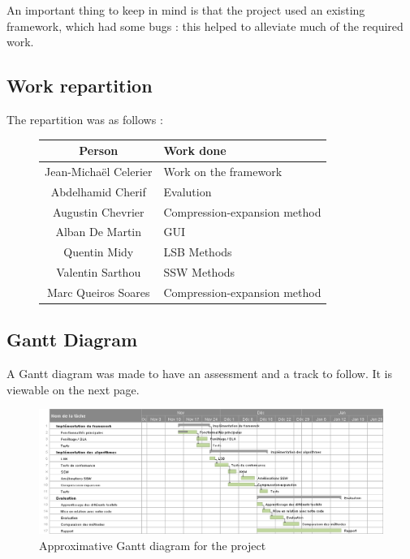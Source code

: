 An important thing to keep in mind is that the project used an existing framework, which had some bugs : this helped to alleviate much of the required work.

\subsection{Work repartition}
The repartition was as follows : 
\begin{figure}[h!]
\centering
\begin{tabular}{|c|l|}
\hline
Person & Work done \\
\hline
Jean-Michaël Celerier & Work on the framework \\
Abdelhamid Cherif & Evalution \\
Augustin Chevrier & Compression-expansion method \\
Alban De Martin & GUI \\
Quentin Midy & LSB Methods \\
Valentin Sarthou & \ac{SSW} Methods \\
Marc Queiros Soares & Compression-expansion method \\
\hline
\end{tabular}
\end{figure}

\subsection{Gantt Diagram}
A Gantt diagram was made to have an assessment and a track to follow. It is viewable on the next page.

\begin{figure}
\centering
\includegraphics[scale=0.65]{images/gantt.png}
\caption{Approximative Gantt diagram for the project}
\label{gantt}
\end{figure}

